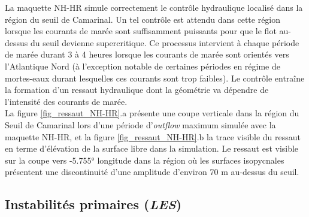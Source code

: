 \documentclass[a4paper,11pt]{report}
\begin{document}
La maquette NH-HR simule correctement le contrôle hydraulique localisé dans la région du seuil de Camarinal. Un tel contrôle est attendu dans cette région lorsque les courants de marée sont suffisamment puissants pour que le flot au-dessus du seuil devienne supercritique. Ce processus intervient à chaque période de marée durant 3 à 4 heures lorsque les courants de marée sont orientés vers l'Atlantique Nord (à l'exception notable de certaines périodes en régime de mortes-eaux durant lesquelles ces courants sont trop faibles). Le contrôle entraîne la formation d'un ressaut hydraulique dont la géométrie va dépendre de l'intensité des courants de marée. \\
La figure \ref{fig_ressaut_NH-HR}.a présente une coupe verticale dans la région du Seuil de Camarinal lors d'une période d'\textit{outflow} maximum simulée avec la maquette NH-HR, et la figure \ref{fig_ressaut_NH-HR}.b la trace visible du ressaut en terme d'élévation de la surface libre dans la simulation. Le ressaut est visible sur la coupe vers -5.755° longitude dans la région où les surfaces isopycnales présentent une discontinuité d'une amplitude d'environ 70 m au-dessus du seuil.\\

\subsection{Instabilités primaires (\textit{LES})}
\end{document}
